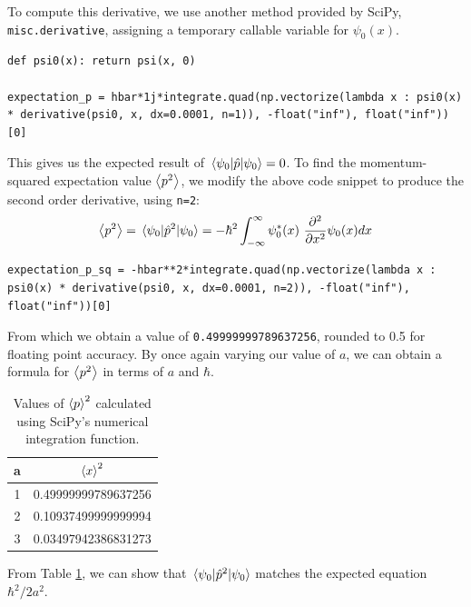 \documentclass[a4paper]{article}
\begin{document}
To compute this derivative, we use another method provided by SciPy, \lstinline$misc.derivative$, assigning a temporary callable variable for $\psi_0(x)$. 
\begin{lstlisting}
def psi0(x): return psi(x, 0)

expectation_p = hbar*1j*integrate.quad(np.vectorize(lambda x : psi0(x) * derivative(psi0, x, dx=0.0001, n=1)), -float("inf"), float("inf"))[0]
\end{lstlisting} This gives us the expected result of $\mel{\psi_0}{\hat p}{\psi_0}=0$.
To find the momentum-squared expectation value $\expval{p^2}$, we modify the above code snippet to produce the second order derivative, using \lstinline$n=2$:
\begin{equation}
\expval {p^2}=\mel{\psi_0}{\hat p^2}{\psi_0}=-\hbar^2\int^\infty_{-\infty}\psi_0^*(x)\ \frac{\partial^2}{\partial x^2} \psi_0(x)dx
\end{equation}
\begin{lstlisting}
expectation_p_sq = -hbar**2*integrate.quad(np.vectorize(lambda x : psi0(x) * derivative(psi0, x, dx=0.0001, n=2)), -float("inf"), float("inf"))[0]
\end{lstlisting} From which we obtain a value of \lstinline$0.49999999789637256$, rounded to 0.5 for floating point accuracy. By once again varying our value of $a$, we can obtain a formula for $\expval{p^2}$ in terms of $a$ and $\hbar$.
\begin{table}[h!]
\centering
\begin{tabular}{cc}
a & $\expval x^2$ \\ \hline
1 & 0.49999999789637256  \\
2 & 0.10937499999999994 \\
3 & 0.03497942386831273
\end{tabular}
\caption{\label{tab:p_table}Values of $\expval p^2$ calculated using SciPy's numerical integration function.}
\end{table}

From Table \ref{tab:p_table}, we can show that $\mel{\psi_0}{\hat p^2}{\psi_0}$ matches the expected equation $\hbar^2/2a^2$.
\newpage
\end{document}
